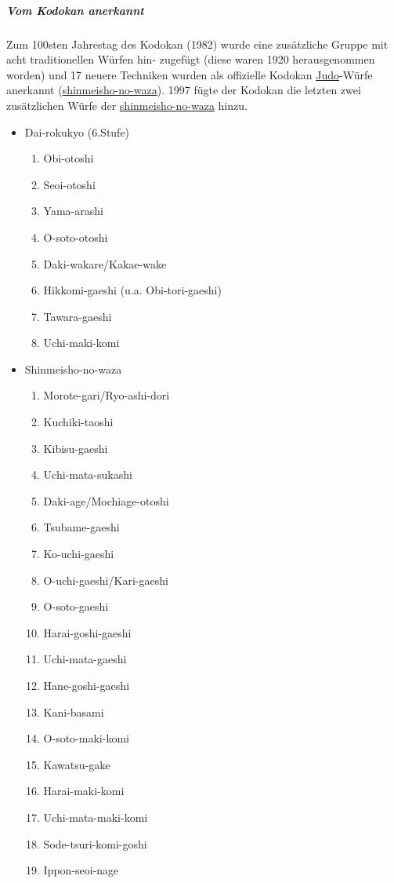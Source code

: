 \documentclass[justified, a4paper, notitlepage, captions=tableheading, nobib]{tufte-handout}
\begin{document}
\subparagraph{Vom Kodokan anerkannt}
\label{sec:org29881ec}
Zum 100sten Jahrestag des Kodokan (1982) wurde eine zusätzliche Gruppe mit acht traditionellen Würfen hin-
zugefügt (diese waren 1920 herausgenommen worden) und 17 neuere Techniken wurden als offizielle Kodokan
\hyperref[org6f56467]{Judo}-Würfe anerkannt (\hyperref[org1882e42]{shinmeisho-no-waza}). 1997 fügte der Kodokan die letzten zwei zusätzlichen Würfe der
\hyperref[org1882e42]{shinmeisho-no-waza} hinzu.

\begin{itemize}
\item Dai-rokukyo (6.Stufe)
\begin{enumerate}
\item Obi-otoshi
\item Seoi-otoshi
\item Yama-arashi
\item O-soto-otoshi
\item Daki-wakare/Kakae-wake
\item Hikkomi-gaeshi (u.a. Obi-tori-gaeshi)
\item Tawara-gaeshi
\item Uchi-maki-komi
\end{enumerate}
\item \label{org1882e42}Shinmeisho-no-waza
\begin{enumerate}
\item Morote-gari/Ryo-ashi-dori
\item Kuchiki-taoshi
\item Kibisu-gaeshi
\item Uchi-mata-sukashi
\item Daki-age/Mochiage-otoshi
\item Tsubame-gaeshi
\item Ko-uchi-gaeshi
\item O-uchi-gaeshi/Kari-gaeshi
\item O-soto-gaeshi
\item Harai-goshi-gaeshi
\item Uchi-mata-gaeshi
\item Hane-goshi-gaeshi
\item Kani-basami
\item O-soto-maki-komi
\item Kawatsu-gake
\item Harai-maki-komi
\item Uchi-mata-maki-komi
\item Sode-tsuri-komi-goshi
\item Ippon-seoi-nage
\end{enumerate}
\end{itemize}
\end{document}
